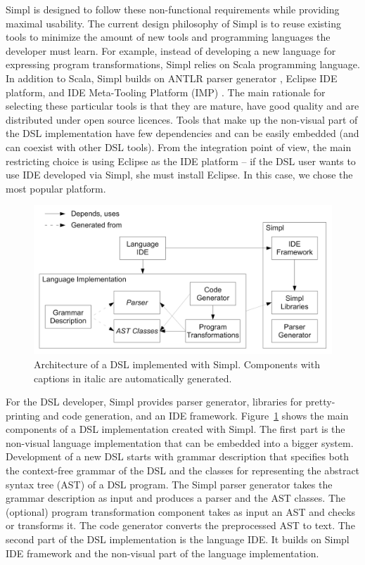 Simpl is designed to follow these non-functional requirements while
providing maximal usability. The current design philosophy of Simpl
is to reuse existing tools to minimize the amount of new tools and
programming languages the developer must learn. For example, instead
of developing a new language for expressing program transformations,
Simpl relies on Scala programming language. In addition to Scala,
Simpl builds on ANTLR parser generator \cite{antlr}, Eclipse IDE
platform, and IDE Meta-Tooling Platform (IMP) \cite{imp}. The main
rationale for selecting these particular tools is that they are mature,
have good quality and are distributed under open source licences.
Tools that make up the non-visual part of the DSL implementation have
few dependencies and can be easily embedded (and can coexist with
other DSL tools). From the integration point of view, the main restricting
choice is using Eclipse as the IDE platform -- if the DSL user wants
to use IDE developed via Simpl, she must install Eclipse. In this
case, we chose the most popular platform.

%
\begin{figure}[!h]
\begin{centering}
\includegraphics[width=0.7\columnwidth]{simpl/architecture.pdf}
\par\end{centering}

\caption{\label{fig:architecture}Architecture of a DSL implemented with Simpl.
Components with captions in italic are automatically generated.}

\end{figure}


For the DSL developer, Simpl provides parser generator, libraries
for pretty-printing and code generation, and an IDE framework. Figure~\ref{fig:architecture}
shows the main components of a DSL implementation created with Simpl.
The first part is the non-visual language implementation that can
be embedded into a bigger system. Development of a new DSL starts
with grammar description that specifies both the context-free grammar
of the DSL and the classes for representing the abstract syntax tree
(AST) of a DSL program. The Simpl parser generator takes the grammar
description as input and produces a parser and the AST classes. The
(optional) program transformation component takes as input an AST
and checks or transforms it. The code generator converts the preprocessed
AST to text. The second part of the DSL implementation is the language
IDE. It builds on Simpl IDE framework and the non-visual part of the
language implementation.



